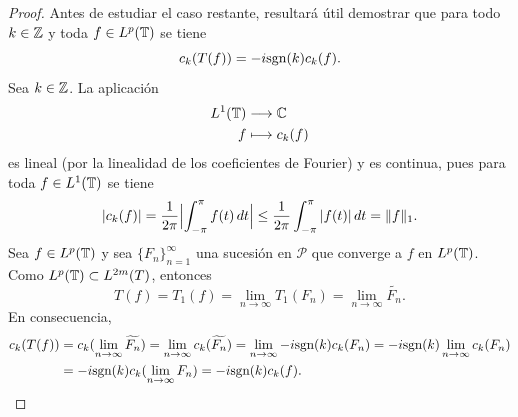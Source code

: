 \documentclass[a4paper, 12pt, oneside]{book}
\begin{document}
\begin{proof}
    Antes de estudiar el caso restante, resultará útil demostrar que para todo $k \in \mathbb Z$ y toda $f \in L^p(\mathbb T)$ se tiene
    \[c_k(T(f)) = -i\textup{sgn}(k)c_k(f).\]
    Sea $k\in\mathbb Z$. La aplicación
    \begin{align*}
        L^1(\mathbb T) &\longrightarrow \mathbb C \\
        f &\longmapsto c_k(f)
    \end{align*}
    es lineal (por la linealidad de los coeficientes de Fourier) y es continua, pues para toda $f\in L^{1}(\mathbb T)$ se tiene
    \[|c_k(f)| = \frac{1}{2\pi}\Bigl|\int_{-\pi}^{\pi} f(t) \, dt\Bigr| \leq \frac{1}{2\pi}\int_{-\pi}^{\pi} |f(t)| \, dt = \|f\|_1.\]
    Sea $f \in L^{p}(\mathbb T)$ y sea $\{F_n\}_{n=1}^\infty$ una sucesión en $\mathcal{P}$ que converge a $f$ en $L^{p}(\mathbb T)$. Como $L^p(\mathbb T) \subset L^{2m}(T)$, entonces
    \[T(f) = T_1(f) = \lim_{n\to\infty} T_1(F_n) = \lim_{n\to\infty} \widetilde{F_n}.\]
    En consecuencia,
    \begin{align*}
        c_k(T(f)) &= c_k(\lim_{n\to\infty} \widetilde{F_n}) =\lim_{n\to\infty} c_k(\widetilde{F_n}) = \lim_{n\to\infty} -i\textup{sgn}(k)c_k(F_n) =-i\textup{sgn}(k)\lim_{n\to\infty} c_k(F_n) \\ 
        &= -i\textup{sgn}(k)c_k(\lim_{n\to\infty} F_n) = -i\textup{sgn}(k)c_k(f).
    \end{align*}


\end{proof}
\end{document}
